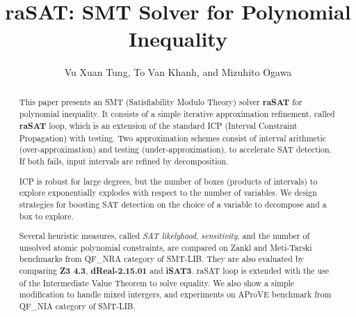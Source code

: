 \documentclass[runningheads,a4paper,oribibl]{llncs}
\begin{document}
%
\title{{\bf raSAT}: SMT Solver for Polynomial Inequality}

\author{Vu Xuan Tung, To Van Khanh, and Mizuhito Ogawa} 


\maketitle

\begin{abstract}
This paper presents an SMT (Satisfiability Modulo Theory) solver {\bf raSAT} for polynomial inequality. 
It consists of a simple iterative approximation refinement, called {\bf raSAT} loop, 
which is an extension of the standard ICP (Interval Constraint Propagation) with testing. 
Two approximation schemes consist of interval arithmetic (over-approximation) and 
testing (under-approximation), to accelerate SAT detection. 
If both fails, input intervals are refined by decomposition. 

ICP is robust for large degrees, but the number of boxes (products of intervals) to explore 
exponentially explodes with respect to the number of variables. 
We design strategies for boosting SAT detection on the choice of a variable to decompose
and a box to explore. 

Several heuristic measures, called {\em SAT likelyhood}, {\em sensitivity}, and the number of 
unsolved atomic polynomial constraints, are compared on Zankl and Meti-Tarski benchmarks from 
QF\_NRA category of SMT-LIB. They are also evaluated by comparing {\bf Z3 4.3}, \textbf{dReal-2.15.01} and {\bf iSAT3}. 
raSAT loop is extended with the use of the Intermediate Value Theorem to solve equality.
We also show a simple modification to handle mixed intergers, and experiments on 
AProVE benchmark from QF\_NIA category of SMT-LIB. 
\end{abstract}

\end{document}
